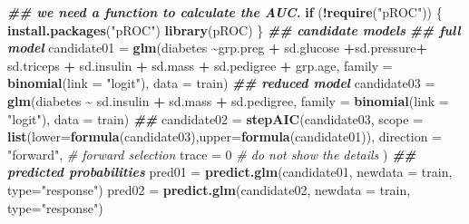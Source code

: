 \documentclass[
]{book}
\newenvironment{Shaded}{\begin{snugshade}}{\end{snugshade}}
\newcommand{\AttributeTok}[1]{\textcolor[rgb]{0.13,0.29,0.53}{#1}}
\newcommand{\CommentTok}[1]{\textcolor[rgb]{0.56,0.35,0.01}{\textit{#1}}}
\newcommand{\ControlFlowTok}[1]{\textcolor[rgb]{0.13,0.29,0.53}{\textbf{#1}}}
\newcommand{\DecValTok}[1]{\textcolor[rgb]{0.00,0.00,0.81}{#1}}
\newcommand{\DocumentationTok}[1]{\textcolor[rgb]{0.56,0.35,0.01}{\textbf{\textit{#1}}}}
\newcommand{\FunctionTok}[1]{\textcolor[rgb]{0.13,0.29,0.53}{\textbf{#1}}}
\newcommand{\NormalTok}[1]{#1}
\newcommand{\OtherTok}[1]{\textcolor[rgb]{0.56,0.35,0.01}{#1}}
\newcommand{\SpecialCharTok}[1]{\textcolor[rgb]{0.81,0.36,0.00}{\textbf{#1}}}
\newcommand{\StringTok}[1]{\textcolor[rgb]{0.31,0.60,0.02}{#1}}
\begin{document}
\begin{Shaded}
\begin{Highlighting}[]
\DocumentationTok{\#\# we need a function to calculate the AUC.}
\ControlFlowTok{if}\NormalTok{ (}\SpecialCharTok{!}\FunctionTok{require}\NormalTok{(}\StringTok{"pROC"}\NormalTok{)) \{}
   \FunctionTok{install.packages}\NormalTok{(}\StringTok{"pROC"}\NormalTok{)}
   \FunctionTok{library}\NormalTok{(pROC)}
\NormalTok{\}}
\DocumentationTok{\#\#  candidate models}
\DocumentationTok{\#\#  full model}
\NormalTok{candidate01 }\OtherTok{=} \FunctionTok{glm}\NormalTok{(diabetes }\SpecialCharTok{\textasciitilde{}}\NormalTok{grp.preg }\SpecialCharTok{+}\NormalTok{ sd.glucose }\SpecialCharTok{+}\NormalTok{sd.pressure}\SpecialCharTok{+}\NormalTok{ sd.triceps }\SpecialCharTok{+}\NormalTok{ sd.insulin }\SpecialCharTok{+} 
\NormalTok{                    sd.mass }\SpecialCharTok{+}\NormalTok{ sd.pedigree }\SpecialCharTok{+}\NormalTok{ grp.age, }\AttributeTok{family =} \FunctionTok{binomial}\NormalTok{(}\AttributeTok{link =} \StringTok{"logit"}\NormalTok{),  }
                    \AttributeTok{data =}\NormalTok{ train)  }
\DocumentationTok{\#\# reduced model}
\NormalTok{candidate03 }\OtherTok{=} \FunctionTok{glm}\NormalTok{(diabetes }\SpecialCharTok{\textasciitilde{}}\NormalTok{ sd.insulin }\SpecialCharTok{+}\NormalTok{ sd.mass }\SpecialCharTok{+}\NormalTok{ sd.pedigree, }
                    \AttributeTok{family =} \FunctionTok{binomial}\NormalTok{(}\AttributeTok{link =} \StringTok{"logit"}\NormalTok{),  }
                    \AttributeTok{data =}\NormalTok{ train) }
\DocumentationTok{\#\# }
\NormalTok{candidate02 }\OtherTok{=} \FunctionTok{stepAIC}\NormalTok{(candidate03, }
                      \AttributeTok{scope =} \FunctionTok{list}\NormalTok{(}\AttributeTok{lower=}\FunctionTok{formula}\NormalTok{(candidate03),}\AttributeTok{upper=}\FunctionTok{formula}\NormalTok{(candidate01)),}
                      \AttributeTok{direction =} \StringTok{"forward"}\NormalTok{,   }\CommentTok{\# forward selection}
                      \AttributeTok{trace =} \DecValTok{0}                \CommentTok{\# do not show the details}
\NormalTok{                      )}
\DocumentationTok{\#\#  predicted probabilities}
\NormalTok{pred01 }\OtherTok{=} \FunctionTok{predict.glm}\NormalTok{(candidate01, }\AttributeTok{newdata =}\NormalTok{ train, }\AttributeTok{type=}\StringTok{"response"}\NormalTok{) }
\NormalTok{pred02 }\OtherTok{=} \FunctionTok{predict.glm}\NormalTok{(candidate02, }\AttributeTok{newdata =}\NormalTok{ train, }\AttributeTok{type=}\StringTok{"response"}\NormalTok{)}

\end{Highlighting}
\end{Shaded}
\end{document}
